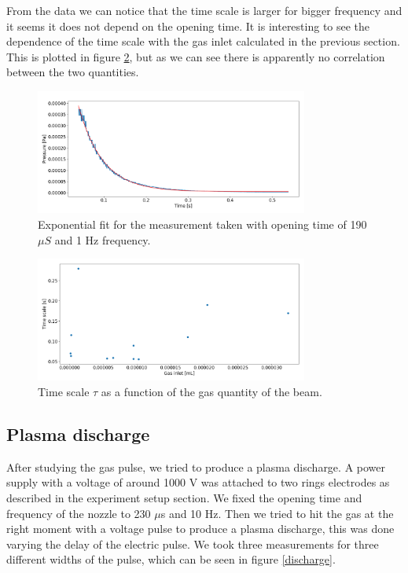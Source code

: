 \documentclass[a4paper,10pt]{article}
\begin{document}
From the data we can notice that the time scale is larger for bigger frequency and it seems it does not depend on the opening time. It is interesting to see the dependence of the time scale with the gas inlet calculated in the previous section. This is plotted in figure \ref{gasinlettimescale}, but as we can see there is apparently no correlation between the two quantities.

\begin{figure}[H]
\centering
\includegraphics[width = 0.8\textwidth]{expfit}
\caption{Exponential fit for the measurement taken with opening time of 190 $\mu S$ and 1 Hz frequency.}\label{expfit}
\end{figure}

\begin{figure}[H]
\centering
\includegraphics[width = 0.8\textwidth]{gasinlettimescale}
\caption{Time scale $\tau$ as a function of the gas quantity of the beam.}\label{gasinlettimescale}
\end{figure}

\subsection{Plasma discharge}
After studying the gas pulse, we tried to produce a plasma discharge. A power supply with a voltage of around 1000 V was attached to two rings electrodes as described in the experiment setup section. We fixed the opening time and frequency of the nozzle to 230 $\mu$s and 10 Hz. Then we tried to hit the gas at the right moment with a voltage pulse to produce a plasma discharge, this was done varying the delay of the electric pulse. We took three measurements for three different widths of the pulse, which can be seen in figure \ref{discharge}. 
\end{document}
